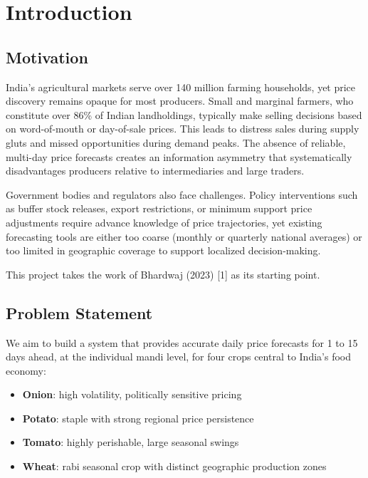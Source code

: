 \documentclass[12pt,a4paper]{article}
\begin{document}
\newpage
\tableofcontents
\newpage

\section{Introduction}
\subsection{Motivation}
India's agricultural markets serve over 140 million farming households, yet price discovery remains opaque for most producers. Small and marginal farmers, who constitute over 86\% of Indian landholdings, typically make selling decisions based on word-of-mouth or day-of-sale prices. This leads to distress sales during supply gluts and missed opportunities during demand peaks. The absence of reliable, multi-day price forecasts creates an information asymmetry that systematically disadvantages producers relative to intermediaries and large traders.

Government bodies and regulators also face challenges. Policy interventions such as buffer stock releases, export restrictions, or minimum support price adjustments require advance knowledge of price trajectories, yet existing forecasting tools are either too coarse (monthly or quarterly national averages) or too limited in geographic coverage to support localized decision-making.

This project takes the work of Bhardwaj (2023) [1] as its starting point.

\subsection{Problem Statement}
We aim to build a system that provides accurate daily price forecasts for 1 to 15 days ahead, at the individual mandi level, for four crops central to India's food economy:

\begin{itemize}
\item \textbf{Onion}: high volatility, politically sensitive pricing
\item \textbf{Potato}: staple with strong regional price persistence
\item \textbf{Tomato}: highly perishable, large seasonal swings
\item \textbf{Wheat}: rabi seasonal crop with distinct geographic production zones
\end{itemize}
\end{document}
